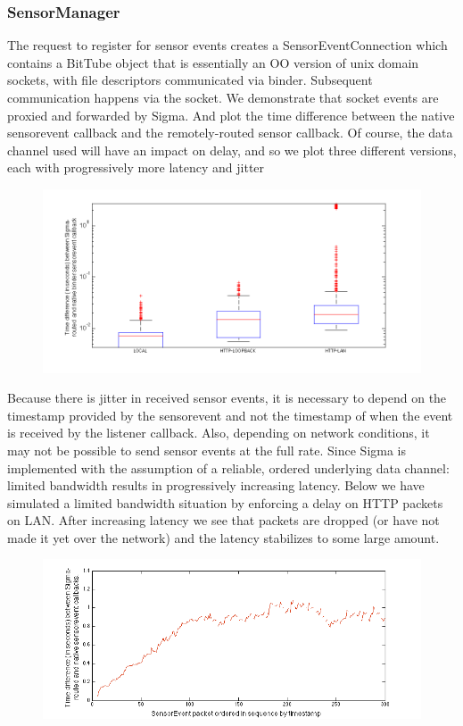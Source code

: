 \documentclass[prodmode]{acmlarge}
\begin{document}
\subsubsection{SensorManager}
The request to register for sensor events creates a SensorEventConnection which contains a BitTube object that is essentially an OO version of unix domain sockets, with file descriptors communicated via binder. Subsequent communication happens via the socket. We demonstrate that socket events are proxied and forwarded by Sigma. And plot the time difference between the native sensorevent callback and the remotely-routed sensor callback. Of course, the data channel used will have an impact on delay, and so we plot three different versions, each with progressively more latency and jitter

\begin{figure}
\centering
\includegraphics[width=\textwidth]{plots/sensorevent_delay.png}
\end{figure}

Because there is jitter in received sensor events, it is necessary to depend on the timestamp provided by the sensorevent and not the timestamp of when the event is received by the listener callback. Also, depending on network conditions, it may not be possible to send sensor events at the full rate. Since Sigma is implemented with the assumption of a reliable, ordered underlying data channel: limited bandwidth results in progressively increasing latency. Below we have simulated a limited bandwidth situation by enforcing a delay on HTTP packets on LAN. After increasing latency we see that packets are dropped (or have not made it yet over the network) and the latency stabilizes to some large amount.

\begin{figure}
\centering
\includegraphics[width=\textwidth]{plots/limited_bandwidth_increasing_latency.png}
\end{figure}
\end{document}
